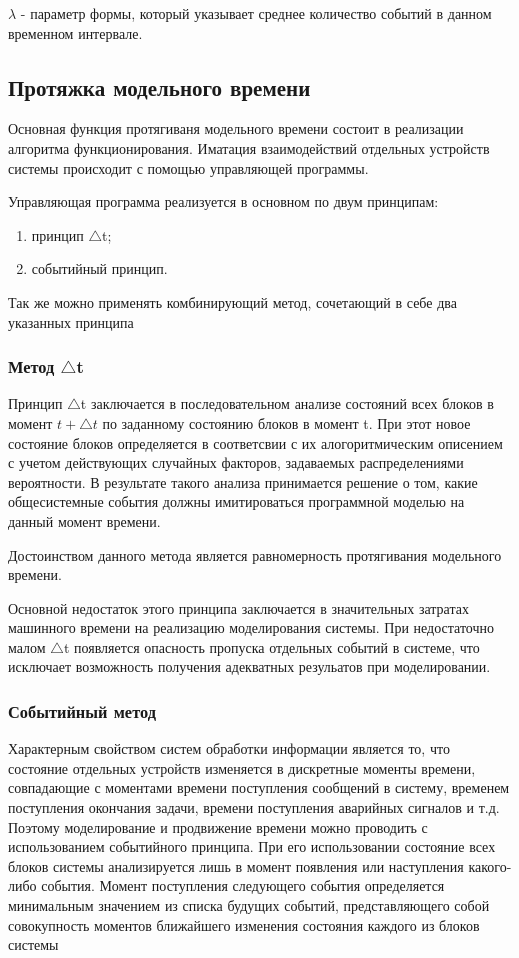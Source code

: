 $\lambda$ - параметр формы, который указывает среднее количество событий в данном временном интервале.

\subsection{Протяжка модельного времени}
Основная функция протягиваня модельного времени состоит в реализации алгоритма функционирования.
Иматация взаимодействий отдельных устройств системы происходит с помощью управляющей программы.

Управляющая программа реализуется в основном по двум принципам:
\begin{enumerate}
	\item принцип $\triangle$t;
	\item событийный принцип.
\end{enumerate} 

Так же можно применять комбинирующий метод, сочетающий в себе два указанных принципа

\subsubsection{Метод $\triangle$t}

Принцип $\triangle$t заключается в последовательном анализе состояний всех блоков в момент $t + \triangle t$ по заданному состоянию блоков в момент t.
При этот новое состояние блоков определяется в соответсвии с их алогоритмическим описением с учетом действующих случайных факторов, задаваемых распределениями вероятности.
В результате такого анализа принимается решение о том, какие общесистемные события должны имитироваться программной моделью на данный момент времени.

Достоинством данного метода является равномерность протягивания модельного времени.

Основной недостаток этого принципа заключается в значительных затратах машинного времени на реализацию моделирования системы. 
При недостаточно малом $\triangle$t появляется опасность пропуска отдельных событий в системе, что исключает возможность получения адекватных резульатов при моделировании.

\subsubsection{Событийный метод }

Характерным свойством систем обработки информации является то, что состояние отдельных устройств изменяется в дискретные моменты времени, совпадающие с моментами времени поступления сообщений в систему, временем поступления окончания задачи, времени поступления аварийных сигналов и т.д. 
Поэтому моделирование и продвижение времени можно проводить с использованием событийного принципа. 
При его использовании состояние всех блоков системы анализируется лишь в момент появления или наступления какого-либо события. 
Момент поступления следующего события определяется минимальным значением из списка будущих событий, представляющего собой совокупность моментов ближайшего изменения состояния каждого из блоков системы

